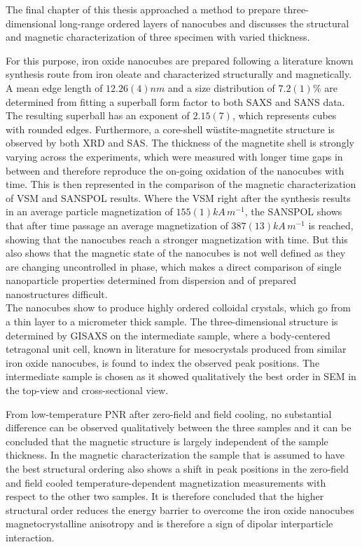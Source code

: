 \documentclass[\main/dresen_thesis.tex]{subfiles}
\begin{document}
  The final chapter of this thesis approached a method to prepare three-dimensional long-range ordered layers of nanocubes and discusses the structural and magnetic characterization of three specimen with varied thickness.

  For this purpose, iron oxide nanocubes are prepared following a literature known synthesis route from iron oleate and characterized structurally and magnetically.
  A mean edge length of $12.26(4) \unit{nm}$ and a size distribution of $7.2(1) \%$ are determined from fitting a superball form factor to both SAXS and SANS data.
  The resulting superball has an exponent of $2.15(7)$, which represents cubes with rounded edges.
  Furthermore, a core-shell w\"ustite-magnetite structure is observed by both XRD and SAS.
  The thickness of the magnetite shell is strongly varying across the experiments, which were measured with longer time gaps in between and therefore reproduce the on-going oxidation of the nanocubes with time.
  This is then represented in the comparison of the magnetic characterization of VSM and SANSPOL results.
  Where the VSM right after the synthesis results in an average particle magnetization of $155(1) \unit{kA\, m^{-1}}$, the SANSPOL shows that after time passage an average magnetization of $387(13) \unit{kA \, m^{-1}}$ is reached, showing that the nanocubes reach a stronger magnetization with time.
  But this also shows that the magnetic state of the nanocubes is not well defined as they are changing uncontrolled in phase, which makes a direct comparison of single nanoparticle properties determined from dispersion and of prepared nanostructures difficult.
  \\

  The nanocubes show to produce highly ordered colloidal crystals, which go from a thin layer to a micrometer thick sample.
  The three-dimensional structure is determined by GISAXS on the intermediate sample, where a body-centered tetragonal unit cell, known in literature for mesocrystals produced from similar iron oxide nanocubes, is found to index the observed peak positions.
  The intermediate sample is chosen as it showed qualitatively the best order in SEM in the top-view and cross-sectional view.

  From low-temperature PNR after zero-field and field cooling, no substantial difference can be observed qualitatively between the three samples and it can be concluded that the magnetic structure is largely independent of the sample thickness.
  In the magnetic characterization the sample that is assumed to have the best structural ordering also shows a shift in peak positions in the zero-field and field cooled temperature-dependent magnetization measurements with respect to the other two samples.
  It is therefore concluded that the higher structural order reduces the energy barrier to overcome the iron oxide nanocubes magnetocrystalline anisotropy and is therefore a sign of dipolar interparticle interaction.
  \\
\end{document}
